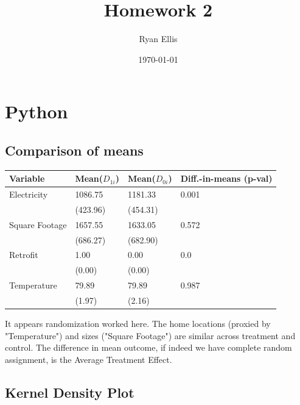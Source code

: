 \documentclass{article}
\title{Homework 2}
\author{Ryan Ellis}
\date{\today}
\begin{document}
  
\maketitle

\section{Python}
\subsection{Comparison of means}


\begin{longtable}{llll}
\hline
 Variable       & Mean($D_{1i}$)   & Mean($D_{0i}$)   & Diff.-in-means (p-val)   \\
\hline
\endhead
 Electricity    & 1086.75                 & 1181.33               & 0.001                          \\
                & (423.96)                & (454.31)              &                                \\
 Square Footage & 1657.55                 & 1633.05               & 0.572                          \\
                & (686.27)                & (682.90)              &                                \\
 Retrofit       & 1.00                    & 0.00                  & 0.0                            \\
                & (0.00)                  & (0.00)                &                                \\
 Temperature    & 79.89                   & 79.89                 & 0.987                          \\
                & (1.97)                  & (2.16)                &                                \\
\hline
\end{longtable}


It appears randomization worked here. The home locations (proxied by "Temperature") and sizes ("Square Footage") are similar across treatment and control. The difference in mean outcome, if indeed we have complete random assignment, is the Average Treatment Effect.

\subsection{Kernel Density Plot}
\end{document}
